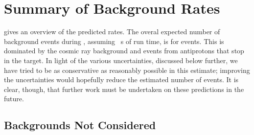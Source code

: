 %

\section{Summary of Background Rates}
\TabBackgroundFinalVals
{} gives an overview of the predicted rates.
The overal expected number of background events during \phaseII, assuming \VarRunTime~s of run time, is for \VarTotalBgPhasII events.
This is dominated by the cosmic ray background and events from antiprotons that stop in the target.
In light of the various uncertainties, discussed below further, we have tried to be as conservative as reasonably possible in this estimate; improving the uncertainties would hopefully reduce the estimated number of events.
It is clear, though, that further work must be undertaken on these predictions in the future.

\subsection{Backgrounds Not Considered}
